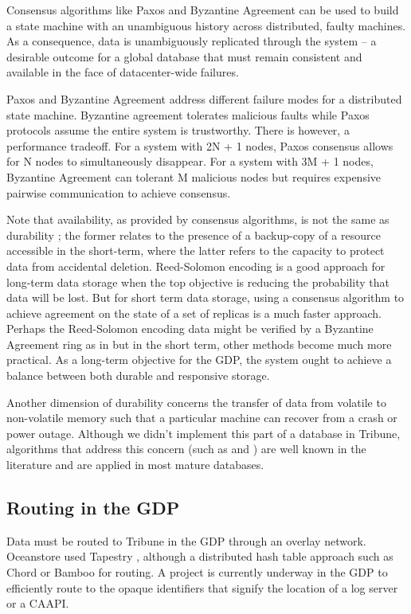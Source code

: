 \documentclass[10pt,twocolumn]{article}
\begin{document}
Consensus algorithms like Paxos \cite{Lamport_paxos} and Byzantine Agreement \cite{lamport_byzantine_1982} can be used to build a state machine with an unambiguous history across distributed, faulty machines. As a consequence, data is unambiguously replicated through the system -- a desirable outcome for a global database that must remain consistent and available in the face of datacenter-wide failures.

Paxos and Byzantine Agreement address different failure modes for a distributed state machine. Byzantine agreement tolerates malicious faults while Paxos protocols assume the entire system is trustworthy. There is however, a performance tradeoff. For a system with 2N + 1 nodes, Paxos consensus allows for N nodes to simultaneously disappear. For a system with 3M + 1 nodes, Byzantine Agreement can tolerant M malicious nodes but requires expensive pairwise communication to achieve consensus.  	

Note that availability, as provided by consensus algorithms,  is not the same as durability \cite{weatherspoon_antiquity:_2007}; the former relates to the presence of a backup-copy of a resource accessible in the short-term, where the latter refers to the capacity to protect data from accidental deletion. Reed-Solomon encoding \cite{Reed-Solomon}  is a good approach for long-term data storage when the top objective is reducing the probability that data will be lost. But for short term data storage, using a consensus algorithm to achieve agreement on the state of a set of replicas is a much faster approach. Perhaps the Reed-Solomon encoding data might be verified by a Byzantine Agreement ring as in \cite{rhea_pond:_2003} but in the short term, other methods become much more practical. As a long-term objective for the GDP, the system ought to achieve a balance between both durable and responsive storage.

Another dimension of durability concerns the transfer of data from volatile to non-volatile memory such that a particular machine can recover from a crash or power outage. Although we didn't implement this part of a database in Tribune, algorithms that address this concern (such as \cite{mohan_aries:_1992} and \cite{sears_segment-based_2009} ) are well known in the literature and are applied in most mature databases.

\subsection{Routing in the GDP}
Data must be routed to Tribune in the GDP through an overlay network. Oceanstore used Tapestry \cite{zhao_tapestry_2004}, although a distributed hash table approach such as Chord \cite{stoica_chord:_2003} or Bamboo \cite{rhea_handling_2003} for routing. A project is currently underway in the GDP to efficiently route to the opaque identifiers that signify the location of a log server or a CAAPI.
\end{document}
